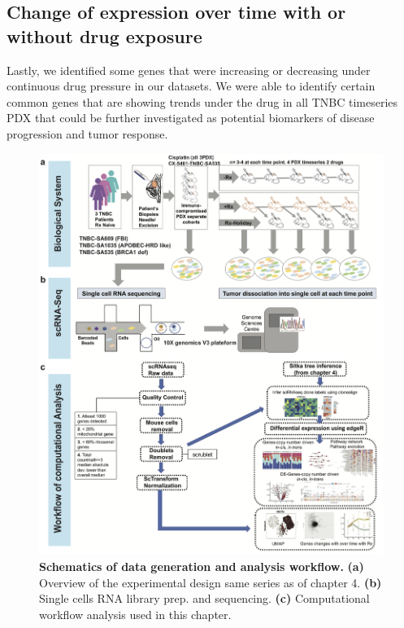 \subsection{Change of expression over time with or without drug exposure}
Lastly, we identified some genes that were increasing or decreasing under continuous drug pressure in our datasets. We were able to identify certain common genes that are showing trends under the drug in all TNBC timeseries PDX that could be further investigated as potential biomarkers of disease progression and tumor response.


\begin{figure}
\centering
\includegraphics[width=\textwidth]{Figures/chap5/RNAworkflow.png}
	
\caption[Schematics of experimental design and analysis workflow]
	{\small
	\textbf{Schematics of data generation and analysis workflow.}
	   \textbf{(a)} Overview of the experimental design same series as of chapter 4.
	    \textbf{(b)} Single cells RNA library prep. and sequencing.
	    \textbf{(c)} Computational workflow analysis used in this chapter.
	}
	\label{fig:chap5RNAworkflow}
\end{figure}


